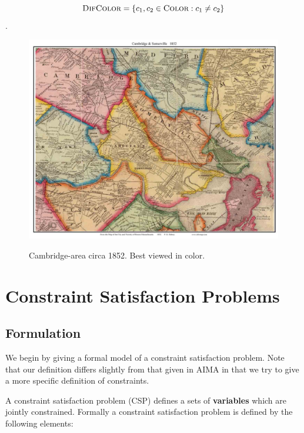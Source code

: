 \documentclass[11pt]{article}
\begin{document}
\[\mathrm{\textsc{DifColor}} = \{c_1, c_2 \in \mathrm{\textsc{Color}} : c_1 \neq c_2 \}\].

\begin{figure}[h]
  \centering
  \includegraphics[width=0.8\linewidth]{CambridgeSomerville_1852_web}
  \label{fig:camb}
  \caption{Cambridge-area circa 1852. Best viewed in color.}
\end{figure}



\section{Constraint Satisfaction Problems}

\subsection{Formulation}

We begin by giving a formal model of a constraint satisfaction problem. Note that our definition differs slightly from that given in AIMA in that we try to give a more specific definition of constraints.


A constraint satisfaction problem (CSP) defines a sets of \textbf{variables} which are jointly constrained. Formally a constraint satisfaction problem is defined by the following elements:
\end{document}

